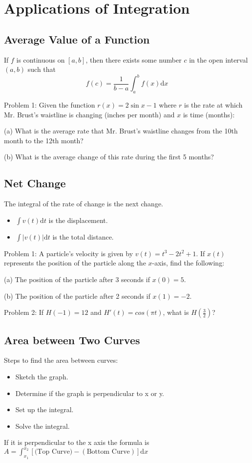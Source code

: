 \documentclass[../abcalc.tex]{subfiles}
\begin{document}
\chapter{Applications of Integration}
\section{Average Value of a Function}
\begin{theorem}
    If $f$ is continuous on $[a,b]$, then there exists some number $c$ in the open interval $(a,b)$ such that 
    \[f(c)=\frac{1}{b-a}\int^b_a f(x)\mathrm{d}x\]
\end{theorem}

Problem 1: Given the function $r(x)=2\sin x-1$ where $r$ is the rate at which Mr. Brust's waistline is changing (inches per month) and $x$ is time (months):

(a) What is the average rate that Mr. Brust's waistline changes from the 10th month to the 12th month?

(b) What is the average change of this rate during the first 5 months?
\section{Net Change}
The integral of the rate of change is the next change.

\begin{itemize}
    \item $\int v(t)\mathrm{d}t$ is the displacement.
    \item $\int |v(t)|\mathrm{d}t$ is the total distance.
\end{itemize}

Problem 1: A particle's velocity is given by $v(t)=t^3-2t^2+1$. If $x(t)$ represents the position of the particle along the $x$-axis, find the following:

(a) The position of the particle after 3 seconds if $x(0)=5$.

(b) The position of the particle after 2 seconds if $x(1)=-2$.

Problem 2: If $H(-1)=12$ and $H'(t)=cos(\pi t)$, what is $H\left(\frac{3}{2}\right)$?
\section{Area between Two Curves}
Steps to find the area between curves:
\begin{itemize}
    \item Sketch the graph.
    \item Determine if the graph is perpendicular to x or y.
    \item Set up the integral.
    \item Solve the integral.
\end{itemize}
If it is perpendicular to the x axis the formula is $A = \int_{x_1}^{x_2}[\text{(Top Curve)}-(\text{Bottom Curve})]\mathrm{d}x$
\end{document}
